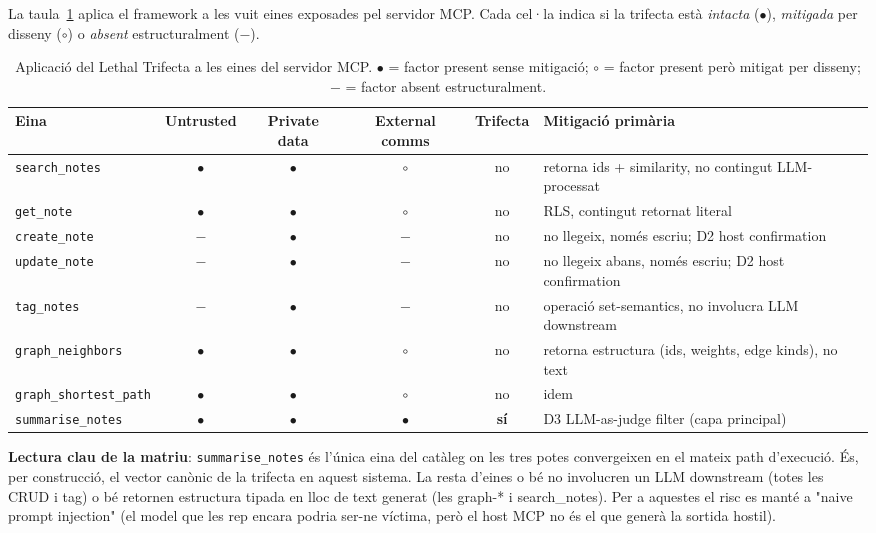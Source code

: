 La taula~\ref{tab:trifecta-matrix} aplica el framework a les vuit eines exposades pel servidor MCP. Cada cel·la indica si la trifecta està \emph{intacta} ($\bullet$), \emph{mitigada} per disseny ($\circ$) o \emph{absent} estructuralment ($-$).

\begin{table}[H]
    \centering
    \footnotesize
    \caption{Aplicació del Lethal Trifecta a les eines del servidor MCP. $\bullet${} = factor present sense mitigació; $\circ${} = factor present però mitigat per disseny; $-${} = factor absent estructuralment.}
    \label{tab:trifecta-matrix}
    \begin{tabular}{@{}lcccc>{\raggedright\arraybackslash}p{4.4cm}@{}}
        \toprule
        Eina & Untrusted & Private data & External comms & Trifecta & Mitigació primària \\
        \midrule
        \texttt{search\_notes} & $\bullet$ & $\bullet$ & $\circ$ & no & retorna ids + similarity, no contingut LLM-processat \\
        \texttt{get\_note} & $\bullet$ & $\bullet$ & $\circ$ & no & RLS, contingut retornat literal \\
        \texttt{create\_note} & $-$ & $\bullet$ & $-$ & no & no llegeix, només escriu; D2 host confirmation \\
        \texttt{update\_note} & $-$ & $\bullet$ & $-$ & no & no llegeix abans, només escriu; D2 host confirmation \\
        \texttt{tag\_notes} & $-$ & $\bullet$ & $-$ & no & operació set-semantics, no involucra LLM downstream \\
        \texttt{graph\_neighbors} & $\bullet$ & $\bullet$ & $\circ$ & no & retorna estructura (ids, weights, edge kinds), no text \\
        \texttt{graph\_shortest\_path} & $\bullet$ & $\bullet$ & $\circ$ & no & idem \\
        \texttt{summarise\_notes} & $\bullet$ & $\bullet$ & $\bullet$ & \textbf{sí} & D3 LLM-as-judge filter (capa principal) \\
        \bottomrule
    \end{tabular}
\end{table}

\textbf{Lectura clau de la matriu}: \texttt{summarise\_notes} és l'única eina del catàleg on les tres potes convergeixen en el mateix path d'execució. És, per construcció, el vector canònic de la trifecta en aquest sistema. La resta d'eines o bé no involucren un LLM downstream (totes les CRUD i tag) o bé retornen estructura tipada en lloc de text generat (les graph-* i search\_notes). Per a aquestes el risc es manté a "naive prompt injection" (el model que les rep encara podria ser-ne víctima, però el host MCP no és el que generà la sortida hostil).

